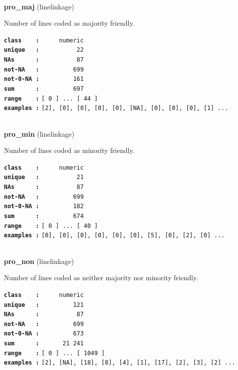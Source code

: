 \documentclass[]{article}
\begin{document}
~

\textbf{pro\_maj} (linelinkage)

Number of lines coded as majority friendly.

\textbf{\texttt{class\ \ \ \ :}} \texttt{~~~~~numeric}\\
\textbf{\texttt{unique\ \ \ :}} \texttt{~~~~~~~~~~22}\\
\textbf{\texttt{NAs\ \ \ \ \ \ :}} \texttt{~~~~~~~~~~87}\\
\textbf{\texttt{not-NA\ \ \ :}} \texttt{~~~~~~~~~699}\\
\textbf{\texttt{not-0-NA\ :}} \texttt{~~~~~~~~~161}\\
\textbf{\texttt{sum\ \ \ \ \ \ :}} \texttt{~~~~~~~~~697}\\
\textbf{\texttt{range\ \ \ \ :}}
\texttt{{[}\ 0\ {]}\ ...\ {[}\ 44\ {]}}\\
\textbf{\texttt{examples\ :}}
\texttt{{[}2{]},\ {[}0{]},\ {[}0{]},\ {[}0{]},\ {[}0{]},\ {[}NA{]},\ {[}0{]},\ {[}0{]},\ {[}0{]},\ {[}1{]}\ ...}\\

~

\textbf{pro\_min} (linelinkage)

Number of lines coded as minority friendly.

\textbf{\texttt{class\ \ \ \ :}} \texttt{~~~~~numeric}\\
\textbf{\texttt{unique\ \ \ :}} \texttt{~~~~~~~~~~21}\\
\textbf{\texttt{NAs\ \ \ \ \ \ :}} \texttt{~~~~~~~~~~87}\\
\textbf{\texttt{not-NA\ \ \ :}} \texttt{~~~~~~~~~699}\\
\textbf{\texttt{not-0-NA\ :}} \texttt{~~~~~~~~~182}\\
\textbf{\texttt{sum\ \ \ \ \ \ :}} \texttt{~~~~~~~~~674}\\
\textbf{\texttt{range\ \ \ \ :}}
\texttt{{[}\ 0\ {]}\ ...\ {[}\ 40\ {]}}\\
\textbf{\texttt{examples\ :}}
\texttt{{[}0{]},\ {[}0{]},\ {[}0{]},\ {[}0{]},\ {[}0{]},\ {[}0{]},\ {[}5{]},\ {[}0{]},\ {[}2{]},\ {[}0{]}\ ...}\\

~

\textbf{pro\_non} (linelinkage)

Number of lines coded as neither majority nor minority friendly.

\textbf{\texttt{class\ \ \ \ :}} \texttt{~~~~~numeric}\\
\textbf{\texttt{unique\ \ \ :}} \texttt{~~~~~~~~~121}\\
\textbf{\texttt{NAs\ \ \ \ \ \ :}} \texttt{~~~~~~~~~~87}\\
\textbf{\texttt{not-NA\ \ \ :}} \texttt{~~~~~~~~~699}\\
\textbf{\texttt{not-0-NA\ :}} \texttt{~~~~~~~~~673}\\
\textbf{\texttt{sum\ \ \ \ \ \ :}} \texttt{~~~~~~21~241}\\
\textbf{\texttt{range\ \ \ \ :}}
\texttt{{[}\ 0\ {]}\ ...\ {[}\ 1049\ {]}}\\
\textbf{\texttt{examples\ :}}
\texttt{{[}2{]},\ {[}NA{]},\ {[}18{]},\ {[}8{]},\ {[}4{]},\ {[}1{]},\ {[}17{]},\ {[}2{]},\ {[}3{]},\ {[}2{]}\ ...}\\
\end{document}
